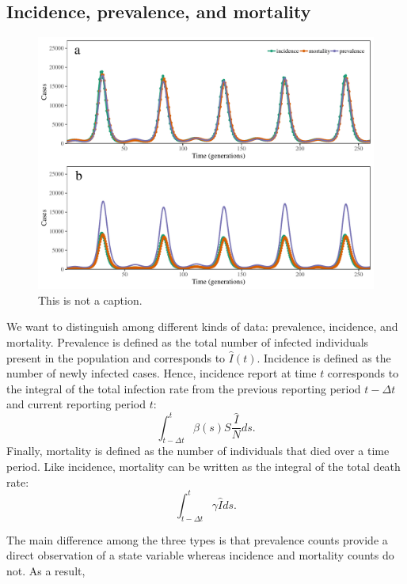 \documentclass{article}
\begin{document}
\subsection{Incidence, prevalence, and mortality}

\begin{figure}[t]
\includegraphics[width=\textwidth]{../figure/inc_prev_mort.pdf}
\caption{This is not a caption.}
\end{figure}

We want to distinguish among different kinds of data: prevalence, incidence, and mortality.
Prevalence is defined as the total number of infected individuals present in the population and corresponds to $\hat{I}(t)$.
Incidence is defined as the number of newly infected cases. 
Hence, incidence report at time $t$ corresponds to the integral of the total infection rate from the previous reporting period $t - \Delta t$ and current reporting period $t$:
\begin{equation}
\int_{t-\Delta t}^{t} \beta(s) S \frac{\hat{I}}{N} ds.
\end{equation}
Finally, mortality is defined as the number of individuals that died over a time period.
Like incidence, mortality can be written as the integral of the total death rate:
\begin{equation}
\int_{t-\Delta t}^{t} \gamma \hat{I} ds.
\end{equation}

The main difference among the three types is that prevalence counts provide a direct observation of a state variable whereas incidence and mortality counts do not.
As a result, 
\end{document}
